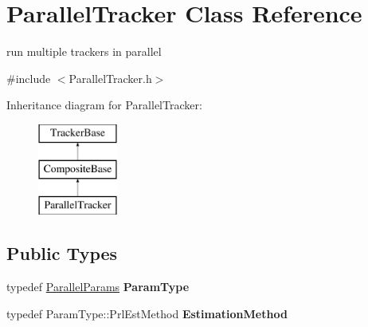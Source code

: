 \hypertarget{classParallelTracker}{\section{Parallel\-Tracker Class Reference}
\label{classParallelTracker}
}


run multiple trackers in parallel  




{\ttfamily \#include $<$Parallel\-Tracker.\-h$>$}

Inheritance diagram for Parallel\-Tracker\-:\begin{figure}[H]
\begin{center}
\leavevmode
\includegraphics[height=3.000000cm]{classParallelTracker}
\end{center}
\end{figure}
\subsection*{Public Types}
\begin{DoxyCompactItemize}
\item 
\hypertarget{classParallelTracker_ad06038b84c806f19981ab41b1682d97c}{typedef \hyperlink{structParallelParams}{Parallel\-Params} {\bfseries Param\-Type}}\label{classParallelTracker_ad06038b84c806f19981ab41b1682d97c}

\item 
\hypertarget{classParallelTracker_a06e56acac22b62df8aa500679fa7d64a}{typedef Param\-Type\-::\-Prl\-Est\-Method {\bfseries Estimation\-Method}}\label{classParallelTracker_a06e56acac22b62df8aa500679fa7d64a}

\end{DoxyCompactItemize}

